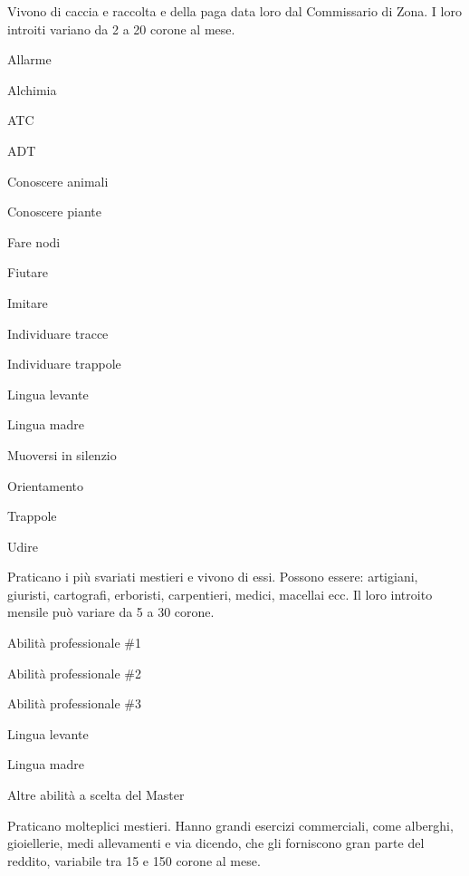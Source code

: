 
Vivono di caccia e raccolta e della paga data loro dal Commissario di
Zona. I loro introiti variano da 2 a 20 corone al mese.

\begin{abilist}
\item Allarme
\item Alchimia
\item ATC
\item ADT
\item Conoscere animali
\item Conoscere piante
\item Fare nodi
\item Fiutare
\item Imitare
\item Individuare tracce
\item Individuare trappole
\item Lingua levante
\item Lingua madre
\item Muoversi in silenzio
\item Orientamento
\item Trappole 
\item Udire
\end{abilist}


Praticano i pi\`u svariati mestieri e vivono di essi. Possono
essere: artigiani, giuristi, cartografi, erboristi, carpentieri,
medici, macellai ecc. Il loro introito mensile pu\`o variare da 5
a 30 corone.

\begin{abilist}
\item Abilit\`a professionale \#1
\item Abilit\`a professionale \#2
\item Abilit\`a professionale \#3
\item Lingua levante
\item Lingua madre
\item Altre abilit\`a a scelta del Master
\end{abilist}


Praticano molteplici mestieri. Hanno grandi esercizi
commerciali, come alberghi, gioiellerie, medi allevamenti e via
dicendo, che gli forniscono gran parte del reddito, variabile tra 15 e
150 corone al mese.

